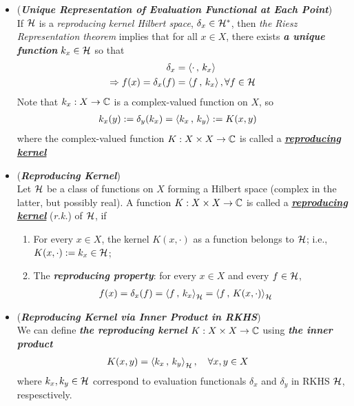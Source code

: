 \documentclass[11pt]{article}
\begin{document}
\begin{itemize}
\item \begin{remark} (\emph{\textbf{Unique Representation of Evaluation Functional at Each Point}})\\
If ${\mathcal H}$ is a \emph{reproducing kernel Hilbert space}, $\delta_x \in {\mathcal H}^{*}$, then \emph{the Riesz Representation theorem} implies that for all $x \in X$, there exists \emph{\textbf{a unique function}} $k_x \in {\mathcal H}$ so that 
\begin{align*}
\delta_x &= \left\langle \cdot\,,\, k_x \right\rangle \\
\Rightarrow f(x) = \delta_x(f) &= \left\langle f\,,\, k_x \right\rangle, \forall f\in {\mathcal H}
\end{align*}
Note that $k_x: X \rightarrow {\mathbb C}$ is a complex-valued function on $X$, so 
\begin{align*}
k_x(y) := \delta_y(k_x) &= \left\langle k_x\,,\, k_y \right\rangle := K(x, y)
\end{align*} where the complex-valued function $K: X \times X \rightarrow {\mathbb C}$ is called a \underline{\emph{\textbf{reproducing kernel}}}
\end{remark}

\item \begin{definition} (\emph{\textbf{Reproducing Kernel}})\\
Let ${\mathcal H}$ be a class of functions on $X$ forming a Hilbert space (complex in the latter, but possibly real). A function $K:  X \times X \rightarrow {\mathbb C}$ is called a \underline{\emph{\textbf{reproducing kernel}}} (\emph{r.k.}) of ${\mathcal H}$, if
\begin{enumerate}
\item For every $x \in X$, the kernel $K(x, \cdot)$ as a function belongs to ${\mathcal H}$; i.e., $K(x, \cdot) := k_x \in {\mathcal H}$; 
\item The \emph{\textbf{reproducing property}}: for every $x \in X$ and every $f\in {\mathcal H}$,
\begin{align}
f(x) = \delta_x(f) &=  \left\langle f\,,\, k_x \right\rangle_{{\mathcal H}}  = \left\langle f\,,\, K(x, \cdot) \right\rangle_{{\mathcal H}}  \label{expr: reprod_property}
\end{align} 
\end{enumerate}
\end{definition}

\item \begin{remark} (\emph{\textbf{Reproducing Kernel via Inner Product in RKHS}})\\
We can define \emph{\textbf{the reproducing kernel}} $K:  X \times X \rightarrow {\mathbb C}$ using \emph{\textbf{the inner product}}
\begin{align*}
K(x, y) &=  \left\langle k_x\,,\, k_y \right\rangle_{{\mathcal H}}, \quad  \forall x, y \in X
\end{align*} where $k_x, k_y \in {\mathcal H}$ correspond to evaluation functionals $\delta_x$ and $\delta_y$ in RKHS ${\mathcal H}$, respesctively. 


\end{remark}
\end{itemize}
\end{document}
